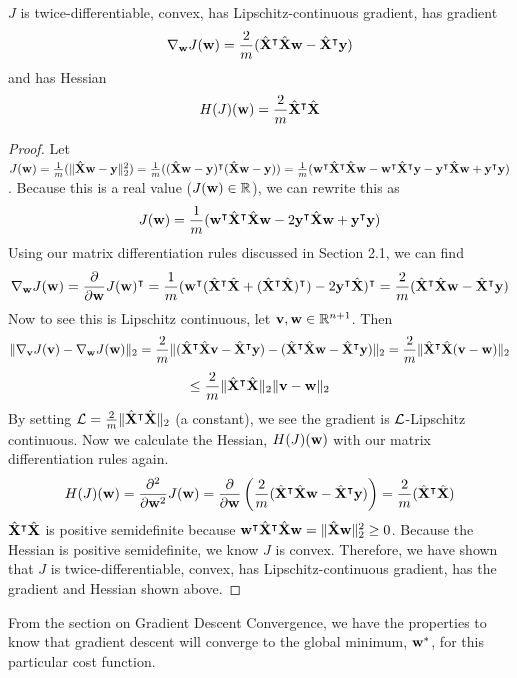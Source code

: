 \begin{proposition}
$J$ is twice-differentiable, convex, has Lipschitz-continuous gradient, has gradient
$$\nabla_{\vw} J(\vw) = \frac{2}{m} (\hat{\MX}^\intercal \hat{\MX} \vw - \hat{\MX} ^\intercal \vy)$$
and has Hessian
$$ H(J)(\vw) = \frac{2}{m} \hat{\MX} ^\intercal \hat{\MX} $$
\begin{proof}
Let $J(\vw)
= \frac{1}{m} (\lVert \hat{\MX} \vw - \vy \rVert_2^2)
= \frac{1}{m} ((\hat{\MX} \vw - \vy)^\intercal (\hat{\MX} \vw - \vy))
= \frac{1}{m} (\vw^\intercal \hat{\MX}^\intercal \hat{\MX} \vw - \vw^\intercal \hat{\MX}^\intercal \vy - \vy^\intercal \hat{\MX} \vw + \vy^\intercal \vy)$. Because this is a real value ($J(\vw) \in \R$), we can rewrite this as
$$ J(\vw) = \frac{1}{m} (\vw^\intercal \hat{\MX}^\intercal \hat{\MX} \vw - 2 \vy^\intercal \hat{\MX} \vw + \vy^\intercal \vy) $$
Using our matrix differentiation rules discussed in Section 2.1, we can find
$$ \nabla_\vw J(\vw) = \frac{\partial}{\partial \vw} J(\vw)^\intercal
= \frac{1}{m}(\vw^\intercal (\hat{\MX} ^\intercal \hat{\MX} + (\hat{\MX} ^\intercal \hat{\MX})^\intercal) - 2 \vy^\intercal \hat{\MX})^\intercal
= \frac{2}{m} (\hat{\MX} ^\intercal \hat{\MX} \vw - \hat{\MX}^\intercal \vy) $$
Now to see this is Lipschitz continuous, let $\vv, \vw \in \R^{n+1}$. Then
$$ \lVert \nabla_\vv J(\vv) - \nabla_\vw J(\vw) \rVert_2
= \frac{2}{m} \lVert (\hat{\MX} ^\intercal \hat{\MX} \vv - \hat{\MX}^\intercal \vy) - (\hat{\MX} ^\intercal \hat{\MX} \vw - \hat{\MX}^\intercal \vy) \rVert_2
= \frac{2}{m} \lVert \hat{\MX} ^\intercal \hat{\MX} (\vv - \vw) \rVert_2$$
$$\leq \frac{2}{m} \lVert \hat{\MX} ^\intercal \hat{\MX} \rVert_2 \lVert \vv - \vw \rVert_2$$
By setting $\Lip = \frac{2}{m} \lVert \hat{\MX} ^\intercal \hat{\MX} \rVert_2$ (a constant), we see the gradient is $\Lip$-Lipschitz continuous. Now we calculate the Hessian, $H(J)(\vw)$ with our matrix differentiation rules again.
$$ H(J)(\vw)
= \frac{\partial^2}{\partial \vw^2} J(\vw)
= \frac{\partial}{\partial \vw} \left( \frac{2}{m} (\hat{\MX} ^\intercal \hat{\MX} \vw - \hat{\MX}^\intercal \vy) \right)
= \frac{2}{m} (\hat{\MX} ^\intercal \hat{\MX})$$
$\hat{\MX} ^\intercal \hat{\MX}$ is positive semidefinite because $\vw^\intercal \hat{\MX} ^\intercal \hat{\MX} \vw = \lVert \hat{\MX} \vw \rVert_2^2 \geq 0$. Because the Hessian is positive semidefinite, we know $J$ is convex. Therefore, we have shown that $J$ is twice-differentiable, convex, has Lipschitz-continuous gradient, has the gradient and Hessian shown above.
\end{proof}
\end{proposition}
From the section on Gradient Descent Convergence, we have the properties to know that gradient descent will converge to the global minimum, $\vw^\ast$, for this particular cost function.

